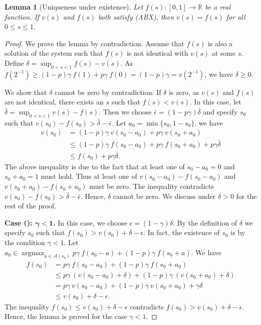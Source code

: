 \documentclass{article}
\newtheorem{lemma}[theorem]{Lemma}
\theoremstyle{named}
\DeclareMathOperator*{\argmax}{arg max}
\newcommand{\RR}{\mathbb{R}}
\newcommand{\cA}{\mathcal{A}}
\begin{document}
\begin{lemma}[Uniqueness under existence]
\label{unique}
Let $f(s): [0,1]\to \RR$ be a real function. If $v(s)$ and $f(s)$ both satisfy ({ABX}), then $v(s)=f(s)$ for all $0\leq s \leq 1$.
\end{lemma}

\begin{proof}
We prove the lemma by contradiction. Assume that $f(s)$ is also a solution of the system such that $f(s)$ is not identical with $v(s)$ at some $s$. Define $\delta=\sup_{0<s<1} f(s)-v(s)$. As $f(2^{-1})\geq (1-p)\gamma\ f(1)+p\gamma\ f(0)=(1-p)\gamma=v(2^{-1})$, we have $\delta\geq 0$. 

We show that $\delta$ cannot be zero by contradiction. If $\delta$ is zero, as $v(s)$ and $f(s)$ are not identical, there exists an $s$ such that $f(s)<v(s)$. In this case, let $\bar\delta=\sup_{0<s<1} v(s)-f(s)$. Then we choose $\bar\epsilon=(1-p\gamma)\bar\delta$ and specify $s_0$ such that $v(s_0)-f(s_0)>\bar\delta-\bar\epsilon$. Let $a_0=\min\{s_0, 1-s_0\}$, we have 
\begin{align*}
v(s_0) &= (1-p)\gamma\ v(s_0-a_0)+p\gamma\ v(s_0+a_0) \\
& \leq (1-p)\gamma\ f(s_0-a_0)+p\gamma\ f(s_0+a_0)+p\gamma\bar\delta \\
& \leq f(s_0)+p\gamma\bar\delta.
\end{align*}
The above inequality is due to the fact that at least one of $s_0-a_0=0$ and $s_0+a_0=1$ must hold. Thus at least one of $v(s_0-a_0)-f(s_0-a_0)$ and $v(s_0+a_0)-f(s_0+a_0)$ must be zero. The inequality contradicts $v(s_0)-f(s_0)>\bar\delta-\bar\epsilon$. Hence, $\delta$ cannot be zero. We discuss under $\delta>0$ for the rest of the proof.

\textbf{Case (): $\bm{\gamma<1}$.} In this case, we choose $\epsilon=(1-\gamma)\delta$. By the definition of $\delta$ we specify $s_0$ such that $f(s_0)>v(s_0)+\delta-\epsilon$. In fact, the existence of $s_0$ is by the condition $\gamma<1$. Let $a_0\in\argmax_{a\in\cA(s_0)}p\gamma\  f(s_0-a)+(1-p)\gamma\ f(s_0+a)$. We have
\begin{align*}
f(s_0) & = p\gamma\ f(s_0-a_0)+(1-p)\gamma\ f(s_0+a_0) \\
& \leq p\gamma\ (v(s_0-a_0)+\delta)+(1-p)\gamma\ (v(s_0+a_0)+\delta) \\
& = p\gamma\ v(s_0-a_0)+(1-p)\gamma\ v(s_0+a_0)+\gamma\delta \\
& \leq v(s_0) + \delta-\epsilon.
\end{align*}
The inequality $f(s_0)\leq v(s_0) + \delta-\epsilon$ contradicts $f(s_0)>v(s_0)+\delta-\epsilon$. Hence, the lemma is proved for the case $\gamma<1$. 


\end{proof}
\end{document}
